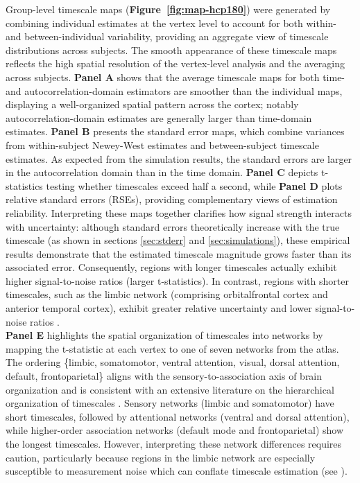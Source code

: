 \documentclass[9pt]{article}
\begin{document}
Group-level timescale maps (\textbf{Figure~\ref{fig:map-hcp180}}) were generated by combining individual estimates at the vertex level to account for both within- and between-individual variability, providing an aggregate view of timescale distributions across subjects. The smooth appearance of these timescale maps reflects the high spatial resolution of the vertex-level analysis and the averaging across subjects. \textbf{Panel A} shows that the average timescale maps for both time- and autocorrelation-domain estimators are smoother than the individual maps, displaying a well-organized spatial pattern across the cortex; notably autocorrelation-domain estimates are generally larger than time-domain estimates. \textbf{Panel B} presents the standard error maps, which combine variances from within-subject Newey-West estimates and between-subject timescale estimates. As expected from the simulation results, the standard errors are larger in the autocorrelation domain than in the time domain. \textbf{Panel C} depicts t-statistics testing whether timescales exceed half a second, while \textbf{Panel D} plots relative standard errors (RSEs), providing complementary views of estimation reliability. Interpreting these maps together clarifies how signal strength interacts with uncertainty: although standard errors theoretically increase with the true timescale (as shown in sections \ref{sec:stderr} and \ref{sec:simulations}), these empirical results demonstrate that the estimated timescale magnitude grows faster than its associated error. Consequently, regions with longer timescales actually exhibit higher signal-to-noise ratios (larger t-statistics). In contrast, regions with shorter timescales, such as the limbic network (comprising orbitalfrontal cortex and anterior temporal cortex), exhibit greater relative uncertainty and lower signal-to-noise ratios \citep{thomas_yeo_organization_2011, du_organization_2024}.\\

\textbf{Panel E} highlights the spatial organization of timescales into networks by mapping the t-statistic at each vertex to one of seven networks from the \citet{thomas_yeo_organization_2011} atlas. The ordering \{limbic, somatomotor, ventral attention, visual, dorsal attention, default, frontoparietal\} aligns with the sensory-to-association axis of brain organization and is consistent with an extensive literature on the hierarchical organization of timescales \citep{murray_hierarchy_2014, stephens_place_2013, raut_hierarchical_2020, gao_neuronal_2020, hasson_hierarchy_2008}. Sensory networks (limbic and somatomotor) have short timescales, followed by attentional networks (ventral and dorsal attention), while higher-order association networks (default mode and frontoparietal) show the longest timescales. However, interpreting these network differences requires caution, particularly because regions in the limbic network are especially susceptible to measurement noise which can conflate timescale estimation (see ).\\
\end{document}
